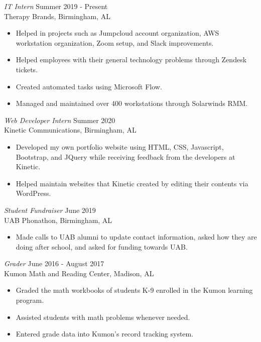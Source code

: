 \documentclass[margin, 10pt]{res} %
\begin{document}
\begin{resume}
{\sl IT Intern} \hfill Summer 2019 - Present \\
Therapy Brands, Birmingham, AL 
\begin{itemize} \itemsep -2pt %
\item Helped in projects such as Jumpcloud account organization, AWS workstation organization, Zoom setup, and Slack improvements.
\item Helped employees with their general technology problems through Zendesk tickets.
\item Created automated tasks using Microsoft Flow.
\item Managed and maintained over 400 workstations through Solarwinds RMM.
\end{itemize} 

{\sl Web Developer Intern} \hfill Summer 2020 \\
Kinetic Communications, Birmingham, AL
\begin{itemize} \itemsep -2pt %
\item Developed my own portfolio website using HTML, CSS, Javascript, Bootstrap, and JQuery while receiving feedback from the developers at Kinetic. 
\item Helped maintain websites that Kinetic created by editing their contents via WordPress. 
\end{itemize}

{\sl Student Fundraiser} \hfill June 2019 \\
UAB Phonathon, Birmingham, AL
\begin{itemize} \itemsep -2pt %
\item Made calls to UAB alumni to update contact information, asked how they are doing after school, and asked for funding towards UAB.
\end{itemize}

{\sl Grader} \hfill June 2016 - August 2017 \\
Kumon Math and Reading Center, Madison, AL
\begin{itemize} \itemsep -2pt %
\item Graded the math workbooks of students K-9 enrolled in the Kumon learning program.
\item Assisted students with math problems whenever needed.
\item Entered grade data into Kumon's record tracking system.
\end{itemize}


\end{resume}
\end{document}
